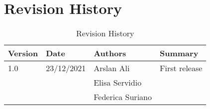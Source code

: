 \section{Revision History}
\begin{center}
\setlength\tabcolsep{7pt}
\renewcommand{\arraystretch}{1.5}
\begin{longtable}{|p{1.5cm}|p{1.8cm}|p{2.75cm}|p{2cm}|}
\caption{Revision History}\\
\hline
\endfirsthead
\endhead
\hline
\endlastfoot
\rowcolor{green2}
\textbf{Version} & \textbf{Date} & \textbf{Authors} & \textbf{Summary}\\
\hline
1.0 & 23/12/2021 & Arslan Ali &  First release\\
& & Elisa Servidio & \\
& & Federica Suriano &\\
\end{longtable}
\end{center}